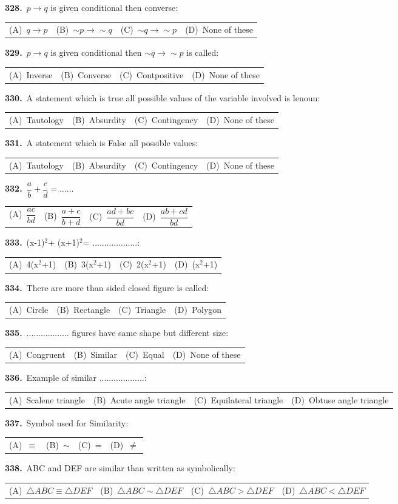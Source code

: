 \documentclass[11pt,a4paper]{article}
\makeatletter
\newcommand{\mcq}[6]{%
  \Needspace{4\baselineskip}%
  \par\medskip\noindent\textbf{#1.}\ #2\par\nopagebreak
  \noindent\begin{tabularx}{\linewidth}{@{\hspace{1.5em}}*{4}{>{\raggedright\arraybackslash}X}@{}}
    (A)~#3 & (B)~#4 & (C)~#5 & (D)~#6
  \end{tabularx}\par}
\makeatother
\begin{document}
\mcq{328}{$p\rightarrow q$ is given conditional then converse:}{$q\rightarrow p$}{$\sim p\rightarrow\sim q$}{$\sim q\rightarrow\sim p$}{None of these}
\mcq{329}{$p\rightarrow q$ is given conditional then $\sim q\rightarrow\sim p$ is called:}{Inverse}{Converse}{Contpositive}{None of these}
\mcq{330}{A statement which is true all possible values of the variable involved is lenoun:}{Tautology}{Absurdity}{Contingency}{None of these}
\mcq{331}{A statement which is False all possible values:}{Tautology}{Absurdity}{Contingency}{None of these}
\mcq{332}{$\dfrac{a}{b}+\dfrac{c}{d}=\ldots\ldots$}{$\dfrac{ac}{bd}$}{$\dfrac{a+c}{b+d}$}{$\dfrac{ad+bc}{bd}$}{$\dfrac{ab+cd}{bd}$}
\mcq{333}{(x-1)$^{2}$+ (x+1)$^{2}$= ...................:}{4(x$^{2}$+1)}{3(x$^{2}$+1)}{2(x$^{2}$+1)}{(x$^{2}$+1)}
\mcq{334}{There are more than sided closed figure is called:}{Circle}{Rectangle}{Triangle}{Polygon}
\mcq{335}{.................. figures have same shape but different size:}{Congruent}{Similar}{Equal}{None of these}
\mcq{336}{Example of similar ...................:}{Scalene triangle}{Acute angle triangle}{Equilateral triangle}{Obtuse angle triangle}
\mcq{337}{Symbol used for Similarity:}{$\equiv$}{$\sim$}{=}{$\neq$}
\mcq{338}{ABC and DEF are similar than written as symbolically:}{$\triangle ABC\equiv\triangle DEF$}{$\triangle ABC\sim\triangle DEF$}{$\triangle ABC>\triangle DEF$}{$\triangle ABC<\triangle DEF$}
\end{document}
